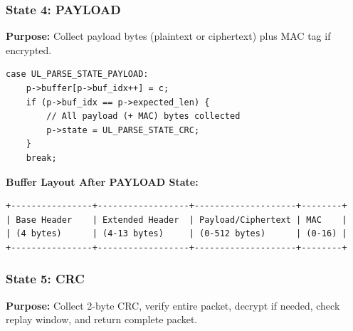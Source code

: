 \documentclass[11pt,a4paper]{article}
\begin{document}
\subsubsection{State 4: PAYLOAD}

\textbf{Purpose:} Collect payload bytes (plaintext or ciphertext) plus MAC tag if encrypted.

\begin{lstlisting}[caption={PAYLOAD State Implementation}]
case UL_PARSE_STATE_PAYLOAD:
    p->buffer[p->buf_idx++] = c;
    if (p->buf_idx == p->expected_len) {
        // All payload (+ MAC) bytes collected
        p->state = UL_PARSE_STATE_CRC;
    }
    break;
\end{lstlisting}

\textbf{Buffer Layout After PAYLOAD State:}
\begin{lstlisting}[language={}]
+----------------+------------------+--------------------+--------+
| Base Header    | Extended Header  | Payload/Ciphertext | MAC    |
| (4 bytes)      | (4-13 bytes)     | (0-512 bytes)      | (0-16) |
+----------------+------------------+--------------------+--------+
\end{lstlisting}

\subsubsection{State 5: CRC}

\textbf{Purpose:} Collect 2-byte CRC, verify entire packet, decrypt if needed, check replay window, and return complete packet.
\end{document}
